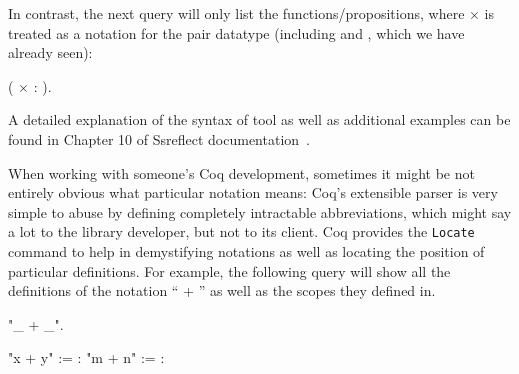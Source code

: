 In contrast, the next query will only list the functions/propositions,
where \coqdocvar{\_} \ensuremath{\times} \coqdocvar{\_} is treated as a notation for the pair datatype
(including  and , which we have already seen):


\begin{coqdoccode}
\coqdocemptyline
\coqdocnoindent
{} \coqdocvar{\_} (\coqdocvar{\_} \ensuremath{\times} \coqdocvar{\_}: ).\coqdoceol
\coqdocemptyline
\end{coqdoccode}


A detailed explanation of the syntax of  tool as well as
additional examples can be found in Chapter 10 of Ssreflect
documentation~\cite{Gontier-al:TR}.


When working with someone's Coq development, sometimes it might be not
entirely obvious what particular notation means: Coq's extensible
parser is very simple to abuse by defining completely intractable
abbreviations, which might say a lot to the library developer, but not
to its client. Coq provides the \texttt{Locate} 
command to help in demystifying notations as well as locating the
position of particular definitions.  For example, the following query
will show all the definitions of the notation ``\coqdocvar{\_} + \coqdocvar{\_}'' as well as the
scopes they defined in.


\begin{coqdoccode}
\coqdocemptyline
\coqdocnoindent
{} "\_ + \_".\coqdoceol
\coqdocemptyline
\end{coqdoccode}


\coqdoceol
\coqdocemptyline
\coqdocnoindent
{}                 \coqdoceol
\coqdocnoindent
"x + y" :=      : \coqdoceol
\coqdocindent{11.00em}
\coqdoceol
\coqdocnoindent
"m + n" :=     : 

\coqdocemptyline


